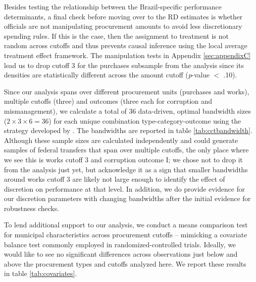\documentclass[11pt]{article}
\begin{document}
Besides testing the relationship between the Brazil-specific performance determinants, a final check before moving over to the RD estimates is whether officials are not manipulating procurement amounts to avoid less discretionary spending rules. If this is the case, then the assignment to treatment is not random across cutoffs and thus prevents causal inference using the local average treatment effect framework. The manipulation tests in Appendix \ref{sec:appendixC} lead us to drop cutoff 3 for the purchases subsample from the analysis since its densities are statistically different across the amount cutoff (\emph{p}-value $<$ .10).

Since our analysis spans over different procurement units (purchases and works), multiple cutoffs (three) and outcomes (three each for corruption and mismanagement), we calculate a total of 36 data-driven, optimal bandwidth sizes ($2 \times 3 \times 6 = 36$) for each unique combination type-category-outcome using the strategy developed by \citet{CalonicoOptimalDataDrivenRegression2015}. The bandwidths are reported in table \ref{tab:cctbandwidth}. Although these sample sizes are calculated independently and could generate samples of federal transfers that span over multiple cutoffs, the only place where we see this is works cutoff 3 and corruption outcome I; we chose not to drop it from the analysis just yet, but acknowledge it as a sign that smaller bandwidths around works cutoff 3 are likely not large enough to identify the effect of discretion on performance at that level. In addition, we do provide evidence for our discretion parameters with changing bandwidths after the initial \citet{CalonicoOptimalDataDrivenRegression2015} evidence for robustness checks.
\clearpage


To lend additional support to our analysis, we conduct a means comparison test for municipal characteristics across procurement cutoffs -- mimicking a covariate balance test commonly employed in randomized-controlled trials. Ideally, we would like to see no significant differences across observations just below and above the procurement types and cutoffs analyzed here. We report these results in table \ref{tab:covariates}.

\clearpage
\end{document}
